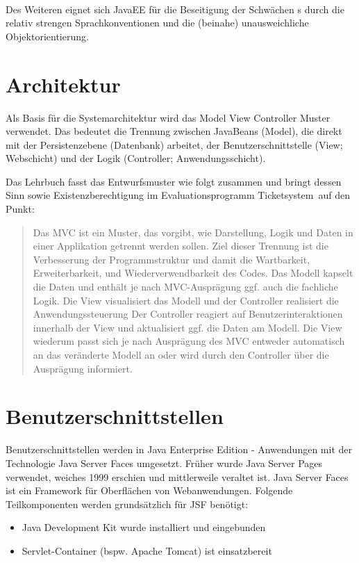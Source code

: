 \paragraph{}
Des Weiteren eignet sich JavaEE für die Beseitigung der Schwächen \getOst s durch die relativ strengen Sprachkonventionen und die (beinahe) unausweichliche Objektorientierung.

\section{Architektur}
Als Basis für die Systemarchitektur wird das Model View Controller Muster verwendet. Das bedeutet die Trennung zwischen JavaBeans (Model), die direkt mit der Persistenzebene (Datenbank) arbeitet, der Benutzerschnittstelle (View; Webschicht) und der Logik (Controller; Anwendungsschicht).

Das Lehrbuch fasst das Entwurfsmuster wie folgt zusammen und bringt dessen Sinn sowie Existenzberechtigung im Evaluationsprogramm \glqq Ticketsystem\grqq\ auf den Punkt:

\blockcquote{javaeeworkshop}{
	Das MVC ist ein Muster, das vorgibt, wie Darstellung, Logik und Daten in einer Applikation getrennt werden sollen. Ziel dieser Trennung ist die Verbesserung der Programmstruktur und damit die Wartbarkeit, Erweiterbarkeit, und Wiederverwendbarkeit des Codes.
	Das Modell kapselt die Daten und enthält je nach MVC-Ausprägung ggf. auch die fachliche Logik. Die View visualisiert das Modell und der Controller realisiert die Anwendungssteuerung Der Controller reagiert auf Benutzerinteraktionen innerhalb der View und aktualisiert ggf. die Daten am Modell. Die View wiederum passt sich je nach Ausprägung des MVC entweder automatisch an das veränderte Modell an oder wird durch den Controller über die Ausprägung informiert.
}

\section{Benutzerschnittstellen} 
Benutzerschnittstellen werden in Java Enterprise Edition - Anwendungen mit der Technologie \glqq Java Server Faces \grqq umgesetzt. Früher wurde \glqq Java Server Pages \grqq verwendet, weiches 1999 erschien und mittlerweile veraltet ist. Java Server Faces ist ein Framework für Oberflächen von Webanwendungen. Folgende Teilkomponenten werden grundsätzlich für JSF benötigt:

\begin{itemize}
	\item Java Development Kit wurde installiert und eingebunden
	\item Servlet-Container (bspw. Apache Tomcat) ist einsatzbereit
\end{itemize}
